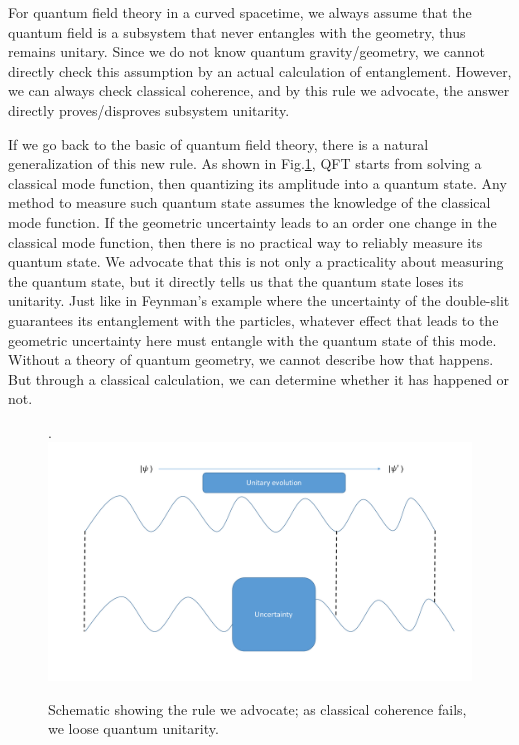 \documentclass[aps,showpacs,twocolumn,floats,prd,superscriptaddress,nofootinbib]{revtex4-1}
\begin{document}
For quantum field theory in a curved spacetime, we always assume that the quantum field is a subsystem that never entangles with the geometry, thus remains unitary.
Since we do not know quantum gravity/geometry, we cannot directly check this assumption by an actual calculation of entanglement.
However, we can always check classical coherence, and by this rule we advocate, the answer directly proves/disproves subsystem unitarity.

If we go back to the basic of quantum field theory, there is a natural generalization of this new rule. 
As shown in Fig.\ref{fig-QFT}, QFT starts from solving a classical mode function, then quantizing its amplitude into a quantum state. 
Any method to measure such quantum state assumes the knowledge of the classical mode function. 
If the geometric uncertainty leads to an order one change in the classical mode function, then there is no practical way to reliably measure its quantum state. 
We advocate that this is not only a practicality about measuring the quantum state, but it directly tells us that the quantum state loses its unitarity. 
Just like in Feynman's example where the uncertainty of the double-slit guarantees its entanglement with the particles, whatever effect that leads to the geometric uncertainty here must entangle with the quantum state of this mode. 
Without a theory of quantum geometry, we cannot describe how that happens. 
But through a classical calculation, we can determine whether it has happened or not.

\begin{figure}[h!]
\begin{center}.
\includegraphics[scale = 0.5]{bh_coherence.pdf}
\caption{Schematic showing the rule we advocate; as classical coherence fails, we loose quantum unitarity.}
\label{fig-QFT}
\end{center}
\end{figure}
\end{document}
